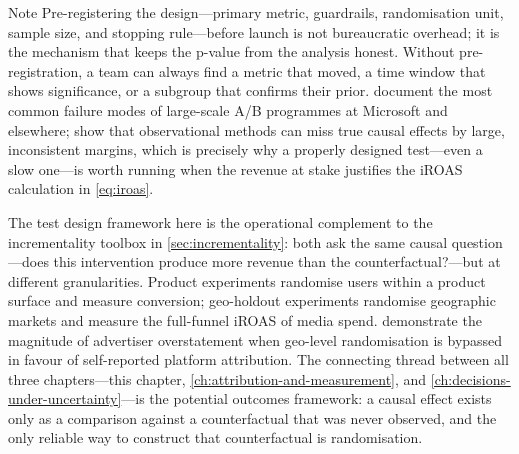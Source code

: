 \begin{admonition}{Note}
Pre-registering the design---primary metric, guardrails, randomisation unit, sample size,
and stopping rule---before launch is not bureaucratic overhead; it is the mechanism that
keeps the p-value from the analysis honest. Without pre-registration, a team can always
find a metric that moved, a time window that shows significance, or a subgroup that
confirms their prior. \textcite{kohavi2020trustworthy} document the most common failure
modes of large-scale A/B programmes at Microsoft and elsewhere; \textcite{gordon2019comparison}
show that observational methods can miss true causal effects by large, inconsistent margins,
which is precisely why a properly designed test---even a slow one---is worth running when
the revenue at stake justifies the iROAS calculation in \cref{eq:iroas}.
\end{admonition}

The test design framework here is the operational complement to the incrementality toolbox
in \cref{sec:incrementality}: both ask the same causal question---does this intervention
produce more revenue than the counterfactual?---but at different granularities. Product
experiments randomise users within a product surface and measure conversion; geo-holdout
experiments randomise geographic markets and measure the full-funnel iROAS of media spend.
\textcite{johnson2017ghost} demonstrate the magnitude of advertiser overstatement when
geo-level randomisation is bypassed in favour of self-reported platform attribution. The
connecting thread between all three chapters---this chapter, \cref{ch:attribution-and-measurement},
and \cref{ch:decisions-under-uncertainty}---is the potential outcomes framework: a causal
effect exists only as a comparison against a counterfactual that was never observed, and the
only reliable way to construct that counterfactual is randomisation.
